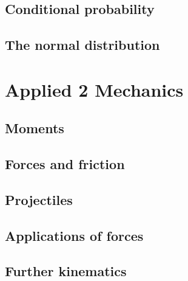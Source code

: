 \documentclass[oneside,fleqn,11pt]{book}
\begin{document}
\chapter{Conditional probability}


\chapter{The normal distribution}


\part{Applied 2 Mechanics}
\setcounter{chapter}{3}
\chapter{Moments}


\chapter{Forces and friction}


\chapter{Projectiles}


\chapter{Applications of forces}


\chapter{Further kinematics}

\end{document}
